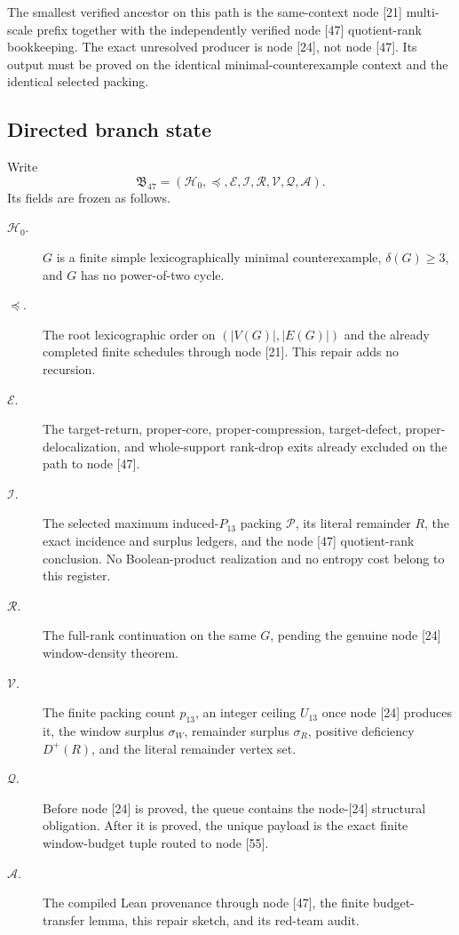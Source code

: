 The smallest verified ancestor on this path is the same-context node [21]
multi-scale prefix together with the independently verified node [47]
quotient-rank bookkeeping.  The exact unresolved producer is node [24], not
node [47].  Its output must be proved on the identical minimal-counterexample
context and the identical selected packing.

\subsection*{Directed branch state}

Write
\[
 \mathfrak B_{47}=(\mathcal H_0,\preceq,\mathcal E,\mathcal I,
 \mathcal R,\mathcal V,\mathcal Q,\mathcal A).
\]
Its fields are frozen as follows.
\begin{description}
\item[$\mathcal H_0$.]
$G$ is a finite simple lexicographically minimal counterexample,
$\delta(G)\ge3$, and $G$ has no power-of-two cycle.
\item[$\preceq$.]
The root lexicographic order on $(|V(G)|,|E(G)|)$ and the already completed
finite schedules through node [21].  This repair adds no recursion.
\item[$\mathcal E$.]
The target-return, proper-core, proper-compression, target-defect,
proper-delocalization, and whole-support rank-drop exits already excluded on
the path to node [47].
\item[$\mathcal I$.]
The selected maximum induced-$P_{13}$ packing $\mathcal P$, its literal
remainder $R$, the exact incidence and surplus ledgers, and the node [47]
quotient-rank conclusion.  No Boolean-product realization and no entropy cost
belong to this register.
\item[$\mathcal R$.]
The full-rank continuation on the same $G$, pending the genuine node [24]
window-density theorem.
\item[$\mathcal V$.]
The finite packing count $p_{13}$, an integer ceiling $U_{13}$ once node [24]
produces it, the window surplus $\sigma_W$, remainder surplus $\sigma_R$,
positive deficiency $D^+(R)$, and the literal remainder vertex set.
\item[$\mathcal Q$.]
Before node [24] is proved, the queue contains the node-[24] structural
obligation.  After it is proved, the unique payload is the exact finite
window-budget tuple routed to node [55].
\item[$\mathcal A$.]
The compiled Lean provenance through node [47], the finite budget-transfer
lemma, this repair sketch, and its red-team audit.
\end{description}


